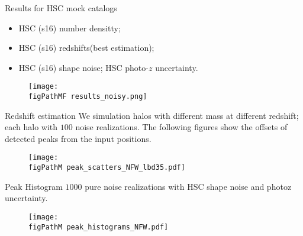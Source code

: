 \begin{frame}{Results for HSC mock catalogs}
\begin{itemize}
    \item HSC (s16) number densitty;
    \item HSC (s16) redshifts(best estimation);
    \item HSC (s16) shape noise; HSC photo-$z$ uncertainty.
\end{itemize}
\begin{figure}
\centering
\texttt{[image: \\figPathMF results\_noisy.png]}
\end{figure}
\end{frame}

\begin{frame}{Redshift estimation}
    We simulation halos with different mass at different redshift; each halo with $100$ noise realizations. The following figures show the \alert{offsets} of detected peaks from the input positions.
\begin{figure}
\centering
\texttt{[image: \\figPathM peak\_scatters\_NFW\_lbd35.pdf]}
\end{figure}
\end{frame}

\begin{frame}{Peak Histogram}
$1000$ pure noise realizations with HSC shape noise and photoz
uncertainty.
\begin{figure}
\centering
\texttt{[image: \\figPathM peak\_histograms\_NFW.pdf]}
\end{figure}
\end{frame}



